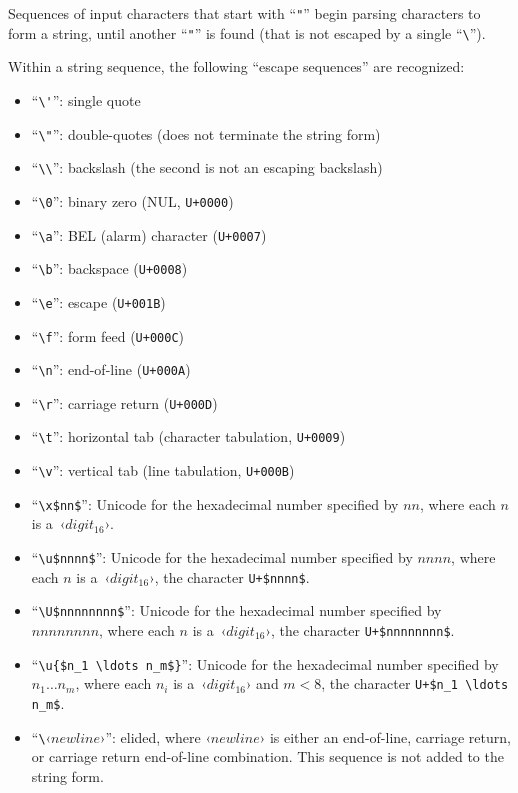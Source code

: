 Sequences of input characters that start with ``\lstinline!"!'' begin parsing characters to form a string, until another ``\lstinline!"!'' is found (that is not escaped by a single ``\lstinline!\!''). %

Within a string sequence, the following ``escape sequences'' are recognized:

\begin{itemize}
  \item ``\lstinline!\'!'': single quote
  \item ``\lstinline!\"!'': double-quotes (does not terminate the string form)
  \item ``\lstinline!\\!'': backslash (the second is not an escaping backslash)
  \item ``\lstinline!\0!'': binary zero (NUL, \lstinline!U+0000!)
  \item ``\lstinline!\a!'': BEL (alarm) character (\lstinline!U+0007!)
  \item ``\lstinline!\b!'': backspace (\lstinline!U+0008!)
  \item ``\lstinline!\e!'': escape (\lstinline!U+001B!)
  \item ``\lstinline!\f!'': form feed (\lstinline!U+000C!)
  \item ``\lstinline!\n!'': end-of-line (\lstinline!U+000A!)
  \item ``\lstinline!\r!'': carriage return (\lstinline!U+000D!)
  \item ``\lstinline!\t!'': horizontal tab (character tabulation, \lstinline!U+0009!)
  \item ``\lstinline!\v!'': vertical tab (line tabulation, \lstinline!U+000B!)
  
  \item ``\lstinline!\x$nn$!'': Unicode for the hexadecimal number specified by $nn$, where each $n$ is a~‹$digit_{16}$›.
  \item ``\lstinline!\u$nnnn$!'': Unicode for the hexadecimal number specified by $nnnn$, where each $n$ is a~‹$digit_{16}$›, the character \lstinline!U+$nnnn$!.
  \item ``\lstinline!\U$nnnnnnnn$!'': Unicode for the hexadecimal number specified by $nnnnnnnn$, where each $n$ is a~‹$digit_{16}$›, the character \lstinline!U+$nnnnnnnn$!.
  
  \item ``\lstinline!\u{$n_1 \ldots n_m$}!'': Unicode for the hexadecimal number specified by $n_1 \ldots n_m$, where each $n_i$ is a~‹$digit_{16}$› and $m < 8$, the character \lstinline!U+$n_1 \ldots n_m$!.
  
  
  \item ``\lstinline!\!‹$newline$›'': elided, where ‹$newline$› is either an end-of-line, carriage return, or carriage return end-of-line combination. This sequence is not added to the string form.
\end{itemize}

